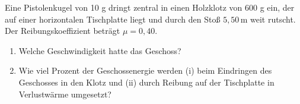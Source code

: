 \begin{ExerciseBlock}
Eine Pistolenkugel von 10 g dringt zentral in einen Holzklotz von 600 g ein, der auf einer horizontalen Tischplatte liegt und durch den Stoß $5,50\,$m weit rutscht. Der Reibungskoeffizient beträgt $\mu=0,40$.

\begin{enumerate}
	\item Welche Geschwindigkeit hatte das Geschoss?

	\item Wie viel Prozent der Geschossenergie werden (i) beim Eindringen des Geschosses in den Klotz und (ii) durch Reibung auf der Tischplatte in Verlustwärme umgesetzt?

\end{enumerate}
\end{ExerciseBlock}
